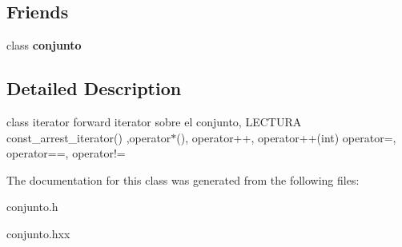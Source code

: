 \subsection*{Friends}
\begin{DoxyCompactItemize}
\item 
\hypertarget{classconjunto_1_1const__arrest__iterator_a42fdcda39c77eabd7380e29fcdbe5dd2}{}class {\bfseries conjunto}\label{classconjunto_1_1const__arrest__iterator_a42fdcda39c77eabd7380e29fcdbe5dd2}

\end{DoxyCompactItemize}


\subsection{Detailed Description}
class iterator forward iterator sobre el conjunto, L\+E\+C\+T\+U\+R\+A const\+\_\+arrest\+\_\+iterator() ,operator$\ast$(), operator++, operator++(int) operator=, operator==, operator!= 

The documentation for this class was generated from the following files\+:\begin{DoxyCompactItemize}
\item 
conjunto.\+h\item 
conjunto.\+hxx\end{DoxyCompactItemize}
